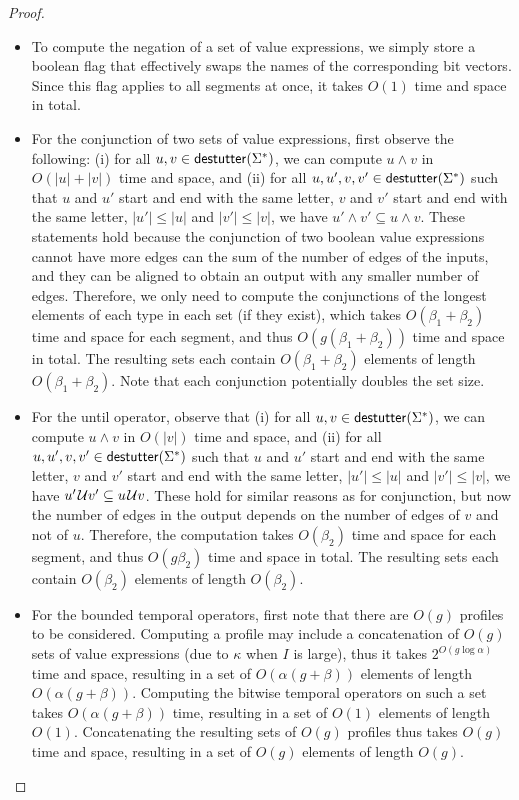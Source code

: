 \begin{proof}
\begin{enumerate}
\begin{itemize}
			\item 
			To compute the negation of a set of value expressions, we simply store a boolean flag that effectively swaps the names of the corresponding bit vectors.
			Since this flag applies to all segments at once, it takes $O(1)$ time and space in total.
						
			\item
			For the conjunction of two sets of value expressions, first observe the following:
			(i) for all $u,v \in \mathsf{destutter}(\Sigma^*)$, we can compute $u \land v$ in $O(|u|+|v|)$ time and space, and
			(ii) for all $u, u', v, v' \in \mathsf{destutter}(\Sigma^*)$ such that $u$ and $u'$ start and end with the same letter, $v$ and $v'$ start and end with the same letter, $|u'| \leq |u|$ and $|v'| \leq |v|$, we have $u' \land v' \subseteq u \land v$.
			These statements hold because the conjunction of two boolean value expressions cannot have more edges can the sum of the number of edges of the inputs, and they can be aligned to obtain an output with any smaller number of edges. 
			Therefore, we only need to compute the conjunctions of the longest elements of each type in each set (if they exist), which takes $O(\beta_1 + \beta_2)$ time and space for each segment, and thus $O(g (\beta_1 + \beta_2))$ time and space in total.
			The resulting sets each contain $O(\beta_1 + \beta_2)$ elements of length $O(\beta_1 + \beta_2)$.
			Note that each conjunction potentially doubles the set size.
			
			\item
			For the until operator, observe that 
			(i) for all $u,v \in \mathsf{destutter}(\Sigma^*)$, we can compute $u \land v$ in $O(|v|)$ time and space, and
			(ii) for all $u, u', v, v' \in \mathsf{destutter}(\Sigma^*)$ such that $u$ and $u'$ start and end with the same letter, $v$ and $v'$ start and end with the same letter, $|u'| \leq |u|$ and $|v'| \leq |v|$, we have $u' \kern.1em\mathcal{U} v' \subseteq u \kern.1em\mathcal{U} v$.
			These hold for similar reasons as for conjunction, but now the number of edges in the output depends on the number of edges of $v$ and not of $u$. 
			Therefore, the computation takes $O(\beta_2)$ time and space for each segment, and thus $O(g \beta_2)$ time and space in total.
			The resulting sets each contain $O(\beta_2)$ elements of length $O(\beta_2)$.
			
			\item
			For the bounded temporal operators, first note that there are $O(g)$ profiles to be considered.
			Computing a profile may include a concatenation of $O(g)$ sets of value expressions (due to $\kappa$ when $I$ is large), thus it takes $2^{O(g \log \alpha)}$ time and space, resulting in a set of $O(\alpha (g + \beta))$ elements of length $O(\alpha (g + \beta))$.
			Computing the bitwise temporal operators on such a set takes $O(\alpha (g + \beta))$ time, resulting in a set of $O(1)$ elements of length $O(1)$.
			Concatenating the resulting sets of $O(g)$ profiles thus takes $O(g)$ time and space, resulting in a set of $O(g)$ elements of length $O(g)$.			
			

\end{itemize}
\end{enumerate}
\end{proof}
